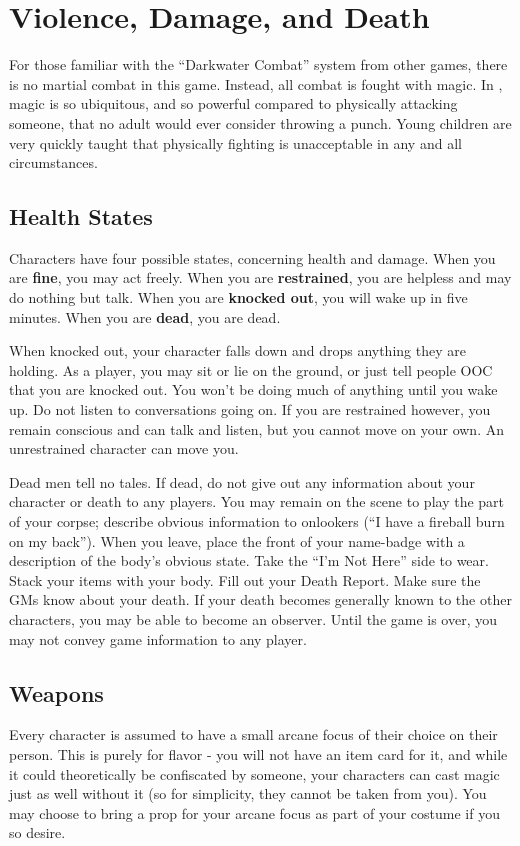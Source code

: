\documentclass[sheet]{GL2020}
\begin{document}
\section{Violence, Damage, and Death}
For those familiar with the ``Darkwater Combat'' system from other games, there is no martial combat in this game. Instead, all combat is fought with magic. In \pEarth{}, magic is so ubiquitous, and so powerful compared to physically attacking someone, that no adult would ever consider throwing a punch. Young children are very quickly taught that physically fighting is unacceptable in any and all circumstances.

\subsection{Health States}

Characters have four possible states, concerning health and damage. When you are {\bf fine}, you may act freely. When you are {\bf restrained}, you are helpless and may do nothing but talk.  When you are {\bf knocked out}, you will wake up in five minutes. When you are {\bf dead}, you are dead.

When knocked out, your character falls down and drops anything they are holding. As a player, you may sit or lie on the ground, or just tell people OOC that you are knocked out. You won't be doing much of anything until you wake up. Do not listen to conversations going on. If you are restrained however, you remain conscious and can talk and listen, but you cannot move on your own. An unrestrained character can move you.

Dead men tell no tales. If dead, do not give out any information about your character or death to any players. You may remain on the scene to play the part of your corpse; describe obvious information to onlookers (``I have a fireball burn on my back''). When you leave, place the front of your name-badge with a description of the body's obvious state. Take the ``I'm Not Here'' side to wear. Stack your items with your body. Fill out your Death Report. Make sure the GMs know about your death. If your death becomes generally known to the other characters, you may be able to become an observer. Until the game is over, you may not convey game information to any player.

\subsection{Weapons}
Every character is assumed to have a small arcane focus of their choice on their person. This is purely for flavor - you will not have an item card for it, and while it could theoretically be confiscated by someone, your characters can cast magic just as well without it (so for simplicity, they cannot be taken from you). You may choose to bring a prop for your arcane focus as part of your costume if you so desire.
\end{document}
